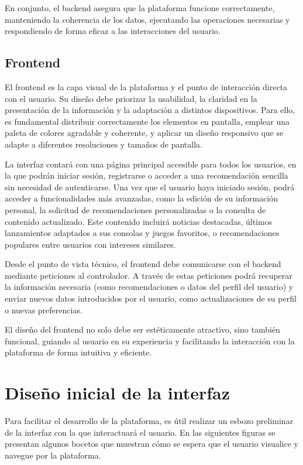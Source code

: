 En conjunto, el backend asegura que la plataforma funcione correctamente, manteniendo la coherencia de los datos, ejecutando las operaciones necesarias y respondiendo de forma eficaz a las interacciones del usuario.



\subsection{Frontend}

El frontend es la capa visual de la plataforma y el punto de interacción directa con el usuario. Su diseño debe priorizar la usabilidad, la claridad en la presentación de la información y la adaptación a distintos dispositivos. Para ello, es fundamental distribuir correctamente los elementos en pantalla, emplear una paleta de colores agradable y coherente, y aplicar un diseño responsivo que se adapte a diferentes resoluciones y tamaños de pantalla.

La interfaz contará con una página principal accesible para todos los usuarios, en la que podrán iniciar sesión, registrarse o acceder a una recomendación sencilla sin necesidad de autenticarse. Una vez que el usuario haya iniciado sesión, podrá acceder a funcionalidades más avanzadas, como la edición de su información personal, la solicitud de recomendaciones personalizadas o la consulta de contenido actualizado. Este contenido incluirá noticias destacadas, últimos lanzamientos adaptados a sus consolas y juegos favoritos, o recomendaciones populares entre usuarios con intereses similares.

Desde el punto de vista técnico, el frontend debe comunicarse con el backend mediante peticiones al controlador. A través de estas peticiones podrá recuperar la información necesaria (como recomendaciones o datos del perfil del usuario) y enviar nuevos datos introducidos por el usuario, como actualizaciones de su perfil o nuevas preferencias.

El diseño del frontend no solo debe ser estéticamente atractivo, sino también funcional, guiando al usuario en su experiencia y facilitando la interacción con la plataforma de forma intuitiva y eficiente.


\newpage
\section{Diseño inicial de la interfaz}

Para facilitar el desarrollo de la plataforma, es útil realizar un esbozo preliminar de la interfaz con la que interactuará el usuario. En las siguientes figuras se presentan algunos bocetos que muestran cómo se espera que el usuario visualice y navegue por la plataforma.

